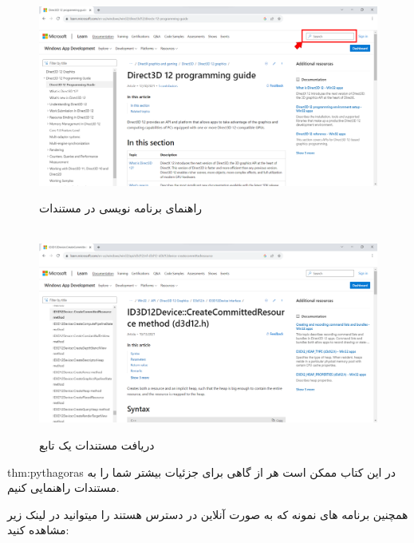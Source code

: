 {    \begin{figure}[H]
        \centering
        \setlength{\belowcaptionskip}{-10pt}
        \includegraphics[width=\textwidth]{Images/1.Intro.1.1.png}
        \caption{راهنمای برنامه نویسی  در مستندات }
        \\[20pt]
        \includegraphics[width=\textwidth]{Images/1.Intro.1.2.png}
        \caption{دریافت مستندات یک تابع}
    \end{figure}

    \begin{theo}{thm:pythagoras}
        در این کتاب ممکن است هر از گاهی برای جزئیات بیشتر شما را به مستندات راهنمایی کنیم.
    \end{theo}
    همچنین برنامه های نمونه  که به صورت آنلاین در دسترس هستند را میتوانید در لینک زیر مشاهده کنید:

}
